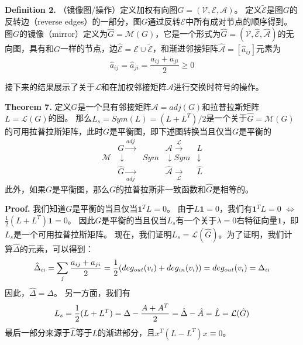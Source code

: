 \documentclass{article}
\begin{document}
\noindent \textbf{Definition 2.} （镜像图/操作）定义加权有向图$G=(\mathcal{V}, \mathcal{E}, \mathcal{A})$。
定义$\tilde{\mathcal{E}}$是图$G$的反转边（reverse edges）的一部分，图$G$通过反转$\mathcal{E}$中所有成对节点的顺序得到。
图$G$的镜像（mirror）定义为$\hat{G}=\mathcal{M}(G)$，它是一个形式为$\hat{G}=(\mathcal{V}, \hat{\mathcal{E}}, \hat{\mathcal{A}})$的无向图，具有和$G$一样的节点，边$\hat{\mathcal{E}}=\mathcal{E}\cup \tilde{\mathcal{E}}$，和渐进邻接矩阵$\hat{\mathcal{A}}=[\hat{a}_{ij}]$元素为
\begin{equation}
    \hat{a}_{ij}=\hat{a}_{ji}=\frac{a_{ij}+a_{ji}}{2}\ge 0
    \tag{25}
    \label{25}
\end{equation}

接下来的结果展示了关于$\mathcal{L}$和在加权邻接矩阵$\mathcal{A}$进行交换时符号的操作。

\noindent \textbf{Theorem 7.} 定义$G$是一个具有邻接矩阵$\mathcal{A}=adj(G)$和拉普拉斯矩阵$L=\mathcal{L}(G)$的图。
那么$L_s = Sym(L) = (L+L^T)/2$是一个关于$\hat{G}=\mathcal{M}(G)$的可用拉普拉斯矩阵，此时$G$是平衡图，即下述图转换当且仅当$G$是平衡的
\begin{equation}
    \begin{aligned}
                    &G \xrightarrow{adj}         &\mathcal{A} \xrightarrow{\mathcal{L}}          &L \\
        \mathcal{M} &\downarrow \quad\quad Sym   &\downarrow  Sym                      &\downarrow \\
                    &\hat{G} \xrightarrow[adj]{} &\hat{\mathcal{A}} \xrightarrow[\mathcal{L}]{}  &\hat{L} 
    \end{aligned}
    \tag{26}
    \label{26}
\end{equation}
此外，如果$G$是平衡图，那么$G$的拉普拉斯非一致函数和$\hat{G}$是相等的。

\noindent\textbf{Proof.} 我们知道$G$是平衡的当且仅当$\textbf{1}^TL=0$。
由于$L\textbf{1}=0$，我们有$\mathbf{1}^TL=0$ $\Leftrightarrow$ $\frac{1}{2}(L+L^T)\mathbf{1}=0$。
因此$G$是平衡的当且仅当$L_s$有一个关于$\lambda=0$右特征向量$\mathbf{1}$，即$L_s$是一个可用拉普拉斯矩阵。
现在，我们证明$L_s=\mathcal{L}(\hat{G})$。为了证明，我们计算$\hat{\Delta}$的元素，可以得到：
\begin{equation}
    \hat{\Delta}_{ii}=\sum_j \frac{a_{ij}+a_{ji}}{2}=\frac{1}{2}(deg_{out}(v_i)+deg_{in}(v_i))=deg_{out}(v_i)=\Delta_{ii}
    \notag
\end{equation}
因此，$\hat{\Delta}=\Delta$。
另一方面，我们有
\begin{equation}
    L_s = \frac{1}{2}(L+L^T) = \Delta-\frac{A+A^T}{2}=\hat{\Delta}-\hat{A}=\hat{L}=\mathcal{L}(\hat{G})
    \notag
\end{equation}
最后一部分来源于$\hat{L}$等于$L$的渐进部分，且$x^T(L-L^T)x\equiv0$。
\end{document}
